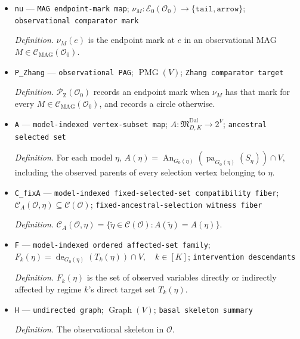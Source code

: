 \documentclass{article}
\begin{document}
\begin{itemize}
  \item \texttt{nu} --- \texttt{MAG endpoint-\allowbreak{}mark map}; \(\nu_M:\mathcal E_0(\mathcal O_0)\to\{\mathtt{tail},\mathtt{arrow}\}\); \texttt{observational comparator mark}
  \par\smallskip\noindent\emph{Definition.} \(\nu_M(e)\) is the endpoint mark at \(e\) in an observational MAG \(M\in\mathcal C_{\mathrm{MAG}}(\mathcal O_0)\).
  \item \texttt{P\_\allowbreak{}Zhang} --- \texttt{observational PAG}; \(\operatorname{PMG}(V)\); \texttt{Zhang comparator target}
  \par\smallskip\noindent\emph{Definition.} \(\mathcal P_{\mathrm{Z}}(\mathcal O_0)\) records an endpoint mark when \(\nu_M\) has that mark for every \(M\in\mathcal C_{\mathrm{MAG}}(\mathcal O_0)\), and records a circle otherwise.
  \item \texttt{A} --- \texttt{model-\allowbreak{}indexed vertex-\allowbreak{}subset map}; \(A:\mathfrak M_{D,K}^{\mathrm{Dai}}\to 2^V\); \texttt{ancestral selected set}
  \par\smallskip\noindent\emph{Definition.} For each model \(\eta\), \(A(\eta)=\operatorname{An}_{G_0(\eta)}(\operatorname{pa}_{G_0(\eta)}(S_\eta))\cap V\), including the observed parents of every selection vertex belonging to \(\eta\).
  \item \texttt{C\_\allowbreak{}fixA} --- \texttt{model-\allowbreak{}indexed fixed-\allowbreak{}selected-\allowbreak{}set compatibility fiber}; \(\mathcal C_A(\mathcal O,\eta)\subseteq\mathcal C(\mathcal O)\); \texttt{fixed-\allowbreak{}ancestral-\allowbreak{}selection witness fiber}
  \par\smallskip\noindent\emph{Definition.} \(\mathcal C_A(\mathcal O,\eta)=\{\widetilde\eta\in\mathcal C(\mathcal O):A(\widetilde\eta)=A(\eta)\}\).
  \item \texttt{F} --- \texttt{model-\allowbreak{}indexed ordered affected-\allowbreak{}set family}; \(F_k(\eta)=\operatorname{de}_{G_0(\eta)}(T_k(\eta))\cap V,\quad k\in[K]\); \texttt{intervention descendants}
  \par\smallskip\noindent\emph{Definition.} \(F_k(\eta)\) is the set of observed variables directly or indirectly affected by regime \(k\)'s direct target set \(T_k(\eta)\).
  \item \texttt{H} --- \texttt{undirected graph}; \(\operatorname{Graph}(V)\); \texttt{basal skeleton summary}
  \par\smallskip\noindent\emph{Definition.} The observational skeleton in \(\mathcal O\).

\end{itemize}
\end{document}
